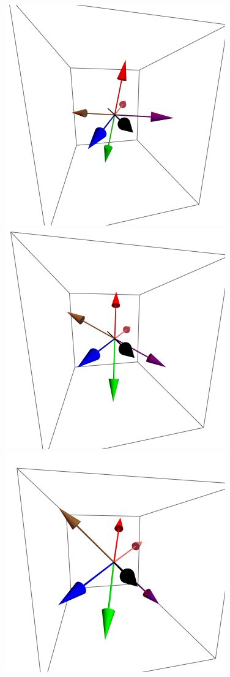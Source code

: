 \documentclass{article}
\begin{document}
\begin{figure}[ht]
\centering
\includegraphics[scale=0.3]{HVariedData/Pictures/010Inc1.png}
\includegraphics[scale=0.3]{HVariedData/Pictures/010Inc111.png}
\includegraphics[scale=0.3]{HVariedData/Pictures/010Inc118.png}

\end{figure}
\end{document}
